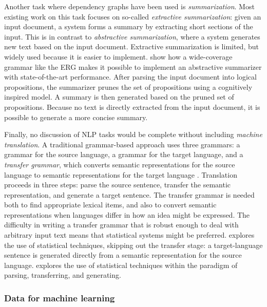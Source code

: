 \documentclass[output=paper,nonflat]{langsci/langscibook}
\begin{document}
Another task where dependency graphs have been used is \textit{summarization}.
Most existing work on this task focuses on so-called \textit{extractive summarization}:
given an input document, a system forms a summary by extracting short sections of the input.
This is in contrast to \textit{abstractive summarization},
where a system generates new text based on the input document.
Extractive summarization is limited, but widely used because it is easier to implement.
\citet{fang2016summarise} show how a wide-coverage grammar like the ERG
makes it possible to implement an abstractive summarizer with state-of-the-art performance.
After parsing the input document into logical propositions,
the summarizer prunes the set of propositions using a cognitively inspired model.
A summary is then generated based on the pruned set of propositions.
Because no text is directly extracted from the input document,
it is possible to generate a more concise summary.

Finally, no discussion of NLP tasks would be complete without including \textit{machine translation}.
A traditional grammar-based approach uses three grammars:
a grammar for the source language,
a grammar for the target language,
and a \textit{transfer grammar}, which converts semantic representations for the source language
to semantic representations for the target language \citep{OVL2007a-u,bond2011deep}.
Translation proceeds in three steps:
parse the source sentence, transfer the semantic representation, and generate a target sentence.
The transfer grammar is needed both to find appropriate lexical items,
and also to convert semantic representations
when languages differ in how an idea might be expressed.
The difficulty in writing a transfer grammar
that is robust enough to deal with arbitrary input text
means that statistical systems might be preferred.
\citet{horvat2017translate} explores the use of statistical techniques,
skipping out the transfer stage:
a target-language sentence is generated directly
from a semantic representation for the source language.
\citet{goodman2018translate} explores the use of statistical techniques
within the paradigm of parsing, transferring, and generating.




\subsubsection{Data for machine learning}
\label{cl:downstream:data}
\end{document}
